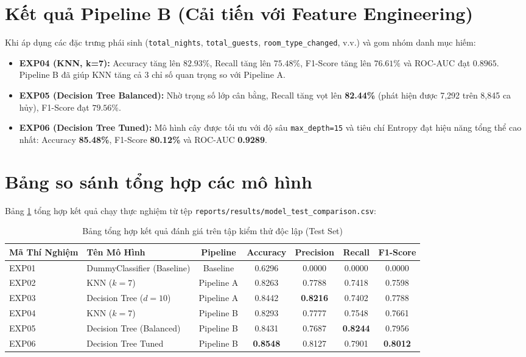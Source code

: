 \section{Kết quả Pipeline B (Cải tiến với Feature Engineering)}
Khi áp dụng các đặc trưng phái sinh (\texttt{total\_nights}, \texttt{total\_guests}, \texttt{room\_type\_changed}, v.v.) và gom nhóm danh mục hiếm:
\begin{itemize}
    \item \textbf{EXP04 (KNN, k=7):} Accuracy tăng lên $82.93\%$, Recall tăng lên $75.48\%$, F1-Score tăng lên $76.61\%$ và ROC-AUC đạt $0.8965$. Pipeline B đã giúp KNN tăng cả 3 chỉ số quan trọng so với Pipeline A.
    \item \textbf{EXP05 (Decision Tree Balanced):} Nhờ trọng số lớp cân bằng, Recall tăng vọt lên \textbf{82.44\%} (phát hiện được 7,292 trên 8,845 ca hủy), F1-Score đạt $79.56\%$.
    \item \textbf{EXP06 (Decision Tree Tuned):} Mô hình cây được tối ưu với độ sâu \texttt{max\_depth=15} và tiêu chí Entropy đạt hiệu năng tổng thể cao nhất: Accuracy \textbf{85.48\%}, F1-Score \textbf{80.12\%} và ROC-AUC \textbf{0.9289}.
\end{itemize}

\section{Bảng so sánh tổng hợp các mô hình}
Bảng \ref{tab:model_comparison} tổng hợp kết quả chạy thực nghiệm từ tệp \texttt{reports/results/model\_test\_comparison.csv}:

\begin{table}[H]
    \centering
    \small
    \caption{Bảng tổng hợp kết quả đánh giá trên tập kiểm thử độc lập (Test Set)}
    \label{tab:model_comparison}
    \begin{tabular}{llccccc}
        \toprule
        \textbf{Mã Thí Nghiệm} & \textbf{Tên Mô Hình} & \textbf{Pipeline} & \textbf{Accuracy} & \textbf{Precision} & \textbf{Recall} & \textbf{F1-Score} \\
        \midrule
        EXP01 & DummyClassifier (Baseline) & Baseline & 0.6296 & 0.0000 & 0.0000 & 0.0000 \\
        EXP02 & KNN ($k=7$) & Pipeline A & 0.8263 & 0.7788 & 0.7418 & 0.7598 \\
        EXP03 & Decision Tree ($d=10$) & Pipeline A & 0.8442 & \textbf{0.8216} & 0.7402 & 0.7788 \\
        EXP04 & KNN ($k=7$) & Pipeline B & 0.8293 & 0.7777 & 0.7548 & 0.7661 \\
        EXP05 & Decision Tree (Balanced) & Pipeline B & 0.8431 & 0.7687 & \textbf{0.8244} & 0.7956 \\
        EXP06 & Decision Tree Tuned & Pipeline B & \textbf{0.8548} & 0.8127 & 0.7901 & \textbf{0.8012} \\
        \bottomrule
    \end{tabular}
\end{table}

